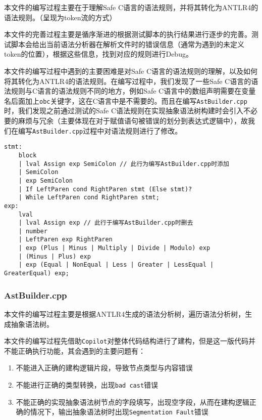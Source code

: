 \documentclass[../main.tex]{subfiles}
\begin{document}
本文件的编写过程主要在于理解Safe C语言的语法规则，并将其转化为ANTLR4的语法规则。（呈现为token流的方式）

本文件的完善过程主要是循序渐进的根据测试脚本的执行结果进行逐步的完善。测试脚本会给出当前语法分析器在解析文件时的错误信息（通常为遇到的未定义token的位置），根据这些信息，找到对应的规则进行Debug。


本文件的编写过程中遇到的主要困难是对Safe C语言的语法规则的理解，以及如何将其转化为ANTLR4的语法规则。在编写过程中，我们发现了一些Safe C语言的语法规则与C语言的语法规则不同的地方，例如Safe C语言中的数组声明需要在变量名后面加上\texttt{obc}关键字，这在C语言中是不需要的。而且在编写\texttt{AstBuilder.cpp}时，我们发现之前通过测试的Safe C语法规则在实现抽象语法树构建时会引入不必要的麻烦与冗余（主要体现在对于赋值语句被错误的划分到表达式逻辑中），故我们在编写\texttt{AstBuilder.cpp}过程中对语法规则进行了修改。

\begin{mdframed}
	\begin{verbatim}
stmt: 
    block
    | lval Assign exp SemiColon // 此行为编写AstBuilder.cpp时添加
    | SemiColon
    | exp SemiColon
    | If LeftParen cond RightParen stmt (Else stmt)?
    | While LeftParen cond RightParen stmt;
exp:
    lval
    | lval Assign exp // 此行于编写AstBuilder.cpp时删去
    | number
    | LeftParen exp RightParen
    | exp (Plus | Minus | Multiply | Divide | Modulo) exp
    | (Minus | Plus) exp
    | exp (Equal | NonEqual | Less | Greater | LessEqual | GreaterEqual) exp;
  \end{verbatim}
\end{mdframed}

\subsubsection{AstBuilder.cpp}

本文件的编写过程主要是根据ANTLR4生成的语法分析树，遍历语法分析树，生成抽象语法树。

本文件的编写过程先借助\texttt{Copilot}对整体代码结构进行了建构，但是这一版代码并不能正确执行功能，其会遇到的主要问题有：

\begin{enumerate}
	\item 不能进入正确的建构逻辑片段，导致节点类型与内容错误
	\item 不能进行正确的类型转换，出现\texttt{bad cast}错误
	\item 不能正确的实现抽象语法树节点的字段填写，出现空字段，从而在建构逻辑正确的情况下，输出抽象语法树时出现\texttt{Segmentation Fault}错误
\end{enumerate}
\end{document}
